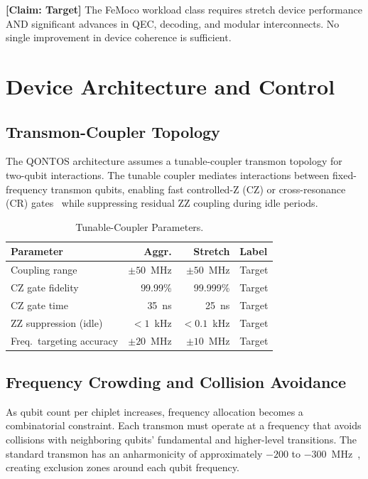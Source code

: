 \documentclass[conference]{IEEEtran}
\begin{document}
\textbf{[Claim: Target]} The FeMoco workload class requires stretch device performance AND significant advances in QEC, decoding, and modular interconnects. No single improvement in device coherence is sufficient.

\section{Device Architecture and Control}

\subsection{Transmon-Coupler Topology}

The QONTOS architecture assumes a tunable-coupler transmon topology for two-qubit interactions. The tunable coupler mediates interactions between fixed-frequency transmon qubits, enabling fast controlled-Z (CZ) or cross-resonance (CR) gates~\cite{sheldon2016} while suppressing residual ZZ coupling during idle periods.

\begin{table}[htbp]
\centering
\caption{Tunable-Coupler Parameters.}
\label{tab:coupler}
\begin{tabular}{lrrl}
\toprule
\textbf{Parameter} & \textbf{Aggr.} & \textbf{Stretch} & \textbf{Label} \\
\midrule
Coupling range & $\pm 50$~MHz & $\pm 50$~MHz & Target \\
CZ gate fidelity & 99.99\% & 99.999\% & Target \\
CZ gate time & 35~ns & 25~ns & Target \\
ZZ suppression (idle) & $< 1$~kHz & $< 0.1$~kHz & Target \\
Freq.\ targeting accuracy & $\pm 20$~MHz & $\pm 10$~MHz & Target \\
\bottomrule
\end{tabular}
\end{table}

\subsection{Frequency Crowding and Collision Avoidance}

As qubit count per chiplet increases, frequency allocation becomes a combinatorial constraint. Each transmon must operate at a frequency that avoids collisions with neighboring qubits' fundamental and higher-level transitions. The standard transmon has an anharmonicity of approximately $-200$ to $-300$~MHz~\cite{koch2007}, creating exclusion zones around each qubit frequency.
\end{document}
